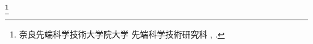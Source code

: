 \begin{center}
 \renewcommand{\thefootnote}{\fnsymbol{footnote}}
 \Large\bfseries \jtitle \footnote[1]{奈良先端科学技術大学院大学 先端科学技術研究科 \jdoctitle, \jdate.}
 \renewcommand{\thefootnote}{\arabic{footnote}}
\end{center}

\vspace*{1truemm}

\begin{center}
 \large\jauthor
\end{center}

\vspace*{1truemm}

\begin{center}
\end{center}

\vspace*{2truemm}
\par
\jabstract
\vspace*{5truemm}

\begin{flushleft}
\end{flushleft}
\vspace{-2mm}\keywords
